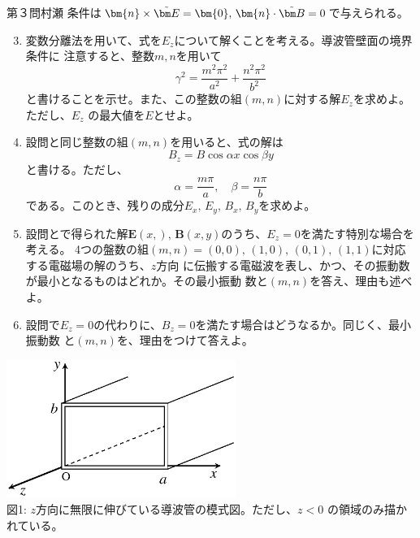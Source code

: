 \begin{question}{第３問}{村瀬}
条件は$\bm{n}\times\tbE=\bm{0},\,\bm{n}\cdot\tbB=0$で与えられる。
\begin{enumerate}
\setcounter{enumi}{2}
\item{}
  変数分離法を用いて、式を$E_z$について解くことを考える。導波管壁面の境界条件に
  注意すると、整数$m,n$を用いて
  \[
    \gamma^2=\frac{m^2\pi^2}{a^2}+\frac{n^2\pi^2}{b^2}
  \]
  と書けることを示せ。また、この整数の組$(m,n)$に対する解$E_z$を求めよ。ただし、$E_z$
  の最大値を$E$とせよ。
\item{}
  設問と同じ整数の組$(m,n)$を用いると、式の解は
  \[
    B_z=B\cos\alpha x\cos\beta y
  \]
  と書ける。ただし、
  \[
    \alpha=\frac{m\pi}{a},\quad \beta=\frac{n\pi}b
  \]
  である。このとき、残りの成分$E_x,\,E_y,\,B_x,\,B_y$を求めよ。
\item{}
  設問とで得られた解$\bm{E}(x,),\,\bm{B}(x,y)$のうち、$E_z=0$を満たす特別な場合を考える。
  4つの盤数の組$(m,n)=(0,0),\,(1,0),\,(0,1),\,(1,1)$に対応する電磁場の解のうち、$z$方向
  に伝搬する電磁波を表し、かつ、その振動数が最小となるものはどれか。その最小振動
  数と$(m,n)$を答え、理由も述べよ。
\item
  設問で$E_z=0$の代わりに、$B_z=0$を満たす場合はどうなるか。同じく、最小振動数
  と$(m,n)$を、理由をつけて答えよ。
\end{enumerate}
\begin{center}
  \includegraphics[width=0.56\textwidth]{2007physQ3_1.eps}\\
  図1: $z$方向に無限に伸びている導波管の模式図。ただし、$z<0$ の領域のみ描かれている。
\end{center}
\end{question}

